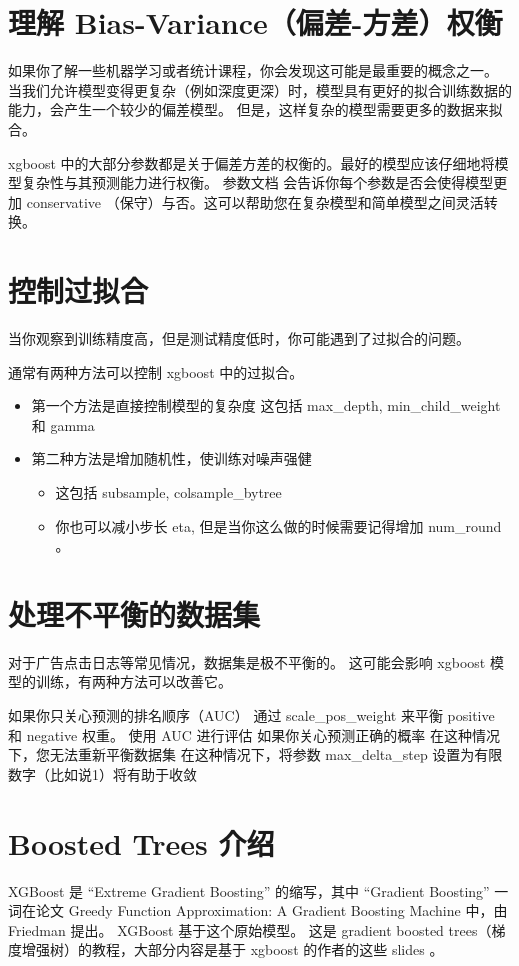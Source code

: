 \documentclass{article}
\begin{document}
\section{理解 Bias-Variance（偏差-方差）权衡}
如果你了解一些机器学习或者统计课程，你会发现这可能是最重要的概念之一。 当我们允许模型变得更复杂（例如深度更深）时，模型具有更好的拟合训练数据的能力，会产生一个较少的偏差模型。 但是，这样复杂的模型需要更多的数据来拟合。

xgboost 中的大部分参数都是关于偏差方差的权衡的。最好的模型应该仔细地将模型复杂性与其预测能力进行权衡。 参数文档 会告诉你每个参数是否会使得模型更加 conservative （保守）与否。这可以帮助您在复杂模型和简单模型之间灵活转换。

\section{控制过拟合}
当你观察到训练精度高，但是测试精度低时，你可能遇到了过拟合的问题。

通常有两种方法可以控制 xgboost 中的过拟合。
\begin{itemize}
\item 第一个方法是直接控制模型的复杂度
这包括 max\_depth, min\_child\_weight 和 gamma
\item 第二种方法是增加随机性，使训练对噪声强健
	\begin{itemize}
			\item 这包括 subsample, colsample\_bytree
			\item 你也可以减小步长 eta, 但是当你这么做的时候需要记得增加 num\_round 。
	\end{itemize}
\end{itemize}
\section{处理不平衡的数据集}
对于广告点击日志等常见情况，数据集是极不平衡的。 这可能会影响 xgboost 模型的训练，有两种方法可以改善它。

如果你只关心预测的排名顺序（AUC）
通过 scale\_pos\_weight 来平衡 positive 和 negative 权重。
使用 AUC 进行评估
如果你关心预测正确的概率
在这种情况下，您无法重新平衡数据集
在这种情况下，将参数 max\_delta\_step 设置为有限数字（比如说1）将有助于收敛
\section{Boosted Trees 介绍}
XGBoost 是 “Extreme Gradient Boosting” 的缩写，其中 “Gradient Boosting” 一词在论文 Greedy Function Approximation: A Gradient Boosting Machine 中，由 Friedman 提出。 XGBoost 基于这个原始模型。 这是 gradient boosted trees（梯度增强树）的教程，大部分内容是基于 xgboost 的作者的这些 slides 。
\end{document}
